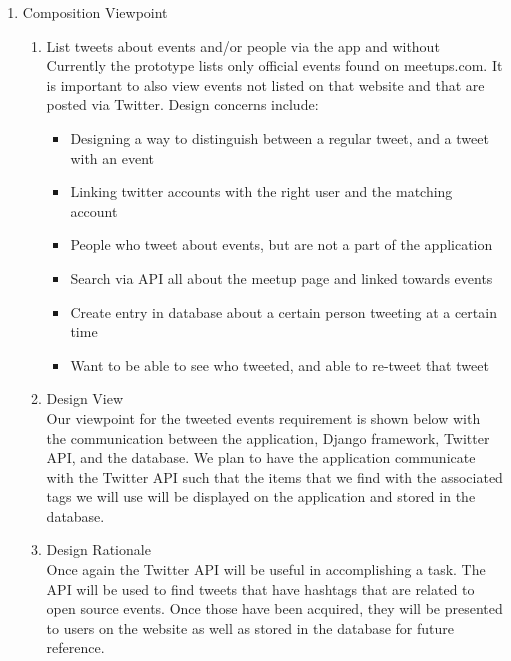 \documentclass[draftclsnofoot,10pt,onecolumn]{IEEEtran} %
\begin{document}
\begin{enumerate}
\begin{enumerate}
		\item Composition Viewpoint \\
			\begin{enumerate}
				\item List tweets about events and/or people via the app and without \\
				Currently the prototype lists only official events found on meetups.com. It is important to also view events
				not listed on that website and that are posted via Twitter. Design concerns include:
				\begin{itemize}
					\item Designing a way to distinguish between a regular tweet, and a tweet with an event
					\item Linking twitter accounts with the right user and the matching account
					\item People who tweet about events, but are not a part of the application
					\item Search via API all about the meetup page and linked towards events
					\item Create entry in database about a certain person tweeting at a certain time
					\item Want to be able to see who tweeted, and able to re-tweet that tweet \\
				\end{itemize}
				
				\item Design View \\ %
				Our viewpoint for the tweeted events requirement is shown below with the communication between the
				application, Django framework, Twitter API, and the database. We plan to have the application
				communicate with the Twitter
				API such that the items that we find with the associated tags we will use will be displayed on the
				application and stored in the database. \\
				
				\item Design Rationale \\
				Once again the Twitter API will be useful in accomplishing a task. The API will be used to find tweets that
				have hashtags that are related to open source events. Once those have been acquired, they will be presented
				to users on the website as well as stored in the database for future reference. \\
			\end{enumerate}
	\end{enumerate}
\end{enumerate}
\end{document}
